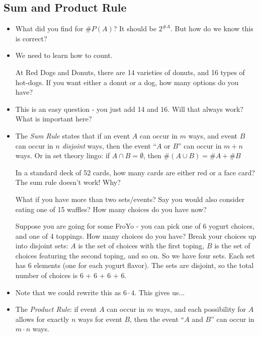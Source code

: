 

\subsection*{Sum and Product Rule}
\begin{itemize}
\item What did you find for $\#P(A)$?  It should be $2^{\#A}$.  But how do we know this is correct?

\item We need to learn how to count.  

\ex At Red Dogs and Donuts, there are 14 varieties of donuts, and 16 types of hot-dogs.  If you want either a donut or a dog, how many options do you have?

\item This is an easy question - you just add 14 and 16.  Will that always work?  What is important here?

\item The {\em Sum Rule} states that if an event $A$ can occur in $m$ ways, and event $B$ can occur in $n$ {\em disjoint} ways, then the event ``$A$ or $B$'' can occur in $m + n$ ways.  Or in set theory lingo: if $A \cap B = \emptyset$, then $\#(A \cup B) = \#A + \#B$

\ex In a standard deck of 52 cards, how many cards are either red or a face card?  The sum rule doesn't work!  Why?

\ex What if you have more than two sets/events?  Say you would also consider eating one of 15 waffles?  How many choices do you have now?

\ex Suppose you are going for some FroYo - you can pick one of 6 yogurt choices, and one of 4 toppings.  How many choices do you have?  Break your choices up into disjoint sets:  $A$ is the set of choices with the first toping, $B$ is the set of choices featuring the second toping, and so on.  So we have four sets.  Each set has 6 elements (one for each yogurt flavor).  The sets are disjoint, so the total number of choices is 6 + 6 + 6 + 6.

\item Note that we could rewrite this as $6 \cdot 4$.  This gives us...

\item The {\em Product Rule}: if event $A$ can occur in $m$ ways, and each possibility for $A$ allows for exactly $n$ ways for event $B$, then the event ``$A$ and $B$'' can occur in $m \cdot n$ ways.


\end{itemize}
